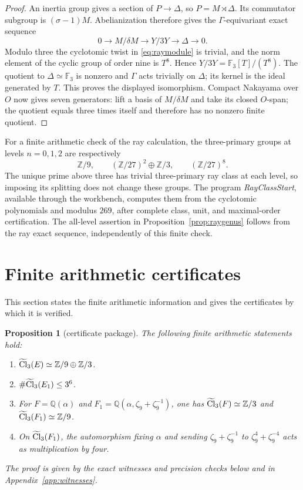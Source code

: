 \documentclass[11pt]{article}
\newtheorem{proposition}[theorem]{Proposition}
\theoremstyle{remark}\newtheorem{remark}[theorem]{Remark}
\newcommand{\Z}{\mathbb Z}\newcommand{\Q}{\mathbb Q}\newcommand{\F}{\mathbb F}
\begin{document}
\begin{proof}
An inertia group gives a section of $P\to\Delta$, so $P=M\rtimes\Delta$.
Its commutator subgroup is $(\sigma-1)M$.
Abelianization therefore gives the $\Gamma$-equivariant exact sequence
\[
 0\longrightarrow M/\delta M\longrightarrow Y/3Y
 \longrightarrow\Delta\longrightarrow0.
\]
Modulo three the cyclotomic twist in \eqref{eq:raymodule} is trivial, and the norm element of the cyclic group of order nine is $T^8$.
Hence $Y/3Y=\F_3[T]/(T^8)$.
The quotient to $\Delta\simeq\F_3$ is nonzero and $\Gamma$ acts trivially on $\Delta$; its kernel is the ideal generated by $T$.
This proves the displayed isomorphism.
Compact Nakayama over $O$ now gives seven generators: lift a basis of $M/\delta M$ and take its closed $O$-span; the quotient equals three times itself and therefore has no nonzero finite quotient.
\end{proof}

For a finite arithmetic check of the ray calculation, the three-primary groups at levels $n=0,1,2$ are respectively
\[
 \Z/9,\qquad (\Z/27)^2\oplus\Z/3,\qquad(\Z/27)^8.
\]
The unique prime above three has trivial three-primary ray class at each level, so imposing its splitting does not change these groups.
The program \emph{RayClassStart}, available through the workbench, computes them from the cyclotomic polynomials and modulus $269$, after complete class, unit, and maximal-order certification.
The all-level assertion in Proposition~\ref{prop:raygenus} follows from the ray exact sequence, independently of this finite check.

\section{Finite arithmetic certificates}
\label{sec:certificates}
This section states the finite arithmetic information and gives the certificates by which it is verified.
\begin{proposition}[certificate package]
\label{prop:certificates}
The following finite arithmetic statements hold:
\begin{enumerate}
\item[(C1)] $\lc(E)\simeq\Z/9\oplus\Z/3$.
\item[(C2)] $\#\widetilde{\operatorname{Cl}}_3(E_1)\leq3^6$.
\item[(C3)] For $F=\Q(\alpha)$ and $F_1=\Q(\alpha,\zeta_9+\zeta_9^{-1})$, one has $\lc(F)\simeq\Z/3$ and $\lc(F_1)\simeq\Z/9$.
\item[(C4)] On $\widetilde{\operatorname{Cl}}_3(F_1)$, the automorphism fixing $\alpha$ and sending $\zeta_9+\zeta_9^{-1}$ to $\zeta_9^4+\zeta_9^{-4}$ acts as multiplication by four.
\end{enumerate}
The proof is given by the exact witnesses and precision checks below and in Appendix~\ref{app:witnesses}.
\end{proposition}
\end{document}
